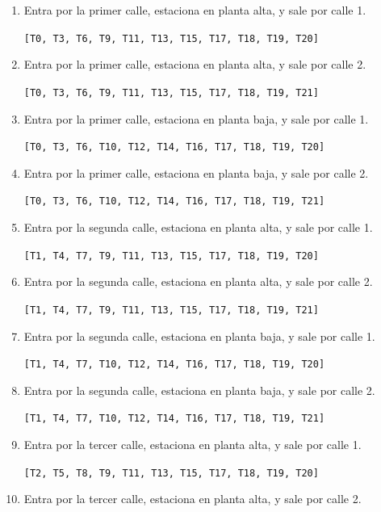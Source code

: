 \documentclass[12pt,a4paper]{article}
\begin{document}
\begin{enumerate}
    \item Entra por la primer calle, estaciona en planta alta, y sale por calle 1.
    
    \verb|[T0, T3, T6, T9, T11, T13, T15, T17, T18, T19, T20]|
    
    \item Entra por la primer calle, estaciona en planta alta, y sale por calle 2.
    
    \verb|[T0, T3, T6, T9, T11, T13, T15, T17, T18, T19, T21]|
    
    \item Entra por la primer calle, estaciona en planta baja, y sale por calle 1.
    
    \verb|[T0, T3, T6, T10, T12, T14, T16, T17, T18, T19, T20]|
    
    \item Entra por la primer calle, estaciona en planta baja, y sale por calle 2.
    
    \verb|[T0, T3, T6, T10, T12, T14, T16, T17, T18, T19, T21]|
    
    \item Entra por la segunda calle, estaciona en planta alta, y sale por calle 1.
    
    \verb|[T1, T4, T7, T9, T11, T13, T15, T17, T18, T19, T20]|
    
    \item Entra por la segunda calle, estaciona en planta alta, y sale por calle 2.
    
    \verb|[T1, T4, T7, T9, T11, T13, T15, T17, T18, T19, T21]|
    
    \item Entra por la segunda calle, estaciona en planta baja, y sale por calle 1.
    
    \verb|[T1, T4, T7, T10, T12, T14, T16, T17, T18, T19, T20]|
    
    \item Entra por la segunda calle, estaciona en planta baja, y sale por calle 2.
    
    \verb|[T1, T4, T7, T10, T12, T14, T16, T17, T18, T19, T21]|
    
    \item Entra por la tercer calle, estaciona en planta alta, y sale por calle 1.
    
    \verb|[T2, T5, T8, T9, T11, T13, T15, T17, T18, T19, T20]|
    
    \item Entra por la tercer calle, estaciona en planta alta, y sale por calle 2.
    

\end{enumerate}
\end{document}
